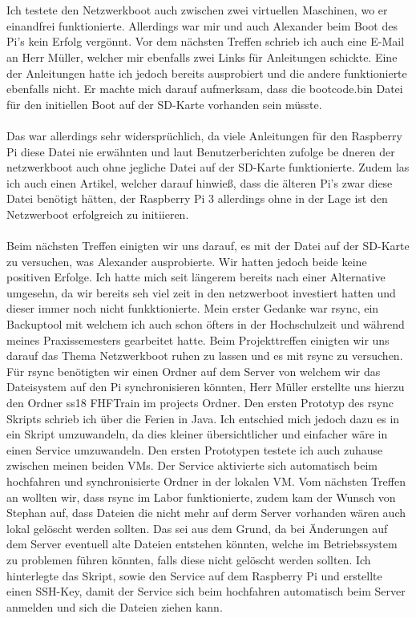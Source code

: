 \documentclass{article}
\begin{document}
\\\\
Ich testete den Netzwerkboot auch zwischen zwei virtuellen Maschinen, wo er einandfrei funktionierte. Allerdings war mir und auch Alexander beim Boot des Pi's kein Erfolg vergönnt. Vor dem nächsten Treffen schrieb ich auch eine E-Mail an Herr Müller, welcher mir ebenfalls zwei Links für Anleitungen schickte. 
Eine der Anleitungen hatte ich jedoch bereits ausprobiert und die andere funktionierte ebenfalls nicht. Er machte mich darauf aufmerksam, dass die bootcode.bin Datei für den initiellen Boot auf der SD-Karte vorhanden sein müsste. 
\\\\ 
Das war allerdings sehr widersprüchlich, da viele Anleitungen für den Raspberry Pi diese Datei nie erwähnten und laut Benutzerberichten zufolge be dneren der netzwerkboot auch ohne jegliche Datei auf der SD-Karte funktionierte. Zudem las ich auch einen Artikel, welcher darauf hinwieß, dass die älteren Pi's zwar diese Datei benötigt hätten, der Raspberry Pi 3 allerdings ohne in der Lage ist den Netzwerboot erfolgreich zu initiieren.
\\\\
Beim nächsten Treffen einigten wir uns darauf, es mit der Datei auf der SD-Karte zu versuchen, was Alexander ausprobierte. Wir hatten jedoch beide keine positiven Erfolge. Ich hatte mich seit längerem bereits nach einer Alternative umgesehn, da wir bereits seh viel zeit in den netzwerboot investiert hatten und dieser immer noch nicht funkktionierte.
Mein erster Gedanke war rsync, ein Backuptool mit welchem ich auch schon öfters in der Hochschulzeit und während meines Praxissemesters gearbeitet hatte. Beim Projekttreffen einigten wir uns darauf das Thema Netzwerkboot ruhen zu lassen und es mit rsync zu versuchen.
Für rsync benötigten wir einen Ordner auf dem Server von welchem wir das Dateisystem auf den Pi synchronisieren könnten, Herr Müller erstellte uns hierzu den Ordner ss18 FHFTrain im projects Ordner. Den ersten Prototyp des rsync Skripts schrieb ich über die Ferien in Java. Ich entschied mich jedoch dazu es in ein Skript umzuwandeln, da dies kleiner übersichtlicher und einfacher wäre in einen Service umzuwandeln. Den ersten Prototypen testete ich auch zuhause zwischen meinen beiden VMs. Der Service aktivierte sich automatisch beim hochfahren und synchronisierte Ordner in der lokalen VM.
Vom nächsten Treffen an wollten wir, dass rsync im Labor funktionierte, zudem kam der Wunsch von Stephan auf, dass Dateien die nicht mehr auf derm Server vorhanden wären auch lokal gelöscht werden sollten. Das sei aus dem Grund, da bei Änderungen auf dem Server eventuell alte Dateien entstehen könnten, welche im Betriebssystem zu problemen führen könnten, falls diese nicht gelöscht werden sollten. Ich hinterlegte das Skript, sowie den Service auf dem Raspberry Pi und erstellte einen SSH-Key, damit der Service sich beim hochfahren automatisch beim Server anmelden und sich die Dateien ziehen kann.
\end{document}
